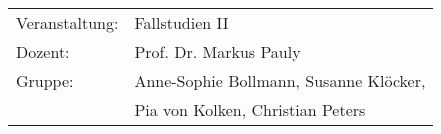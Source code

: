 \begin{titlepage}

  \maketitle

  \vfill

  \begin{tabular}{ll}
    Veranstaltung: & Fallstudien II                           \\
    Dozent:        & Prof. Dr. Markus Pauly                   \\
    Gruppe:        & Anne-Sophie Bollmann, Susanne Kl\"ocker, \\
                   & Pia von Kolken, Christian Peters         \\
  \end{tabular}

  \thispagestyle{empty}
\end{titlepage}